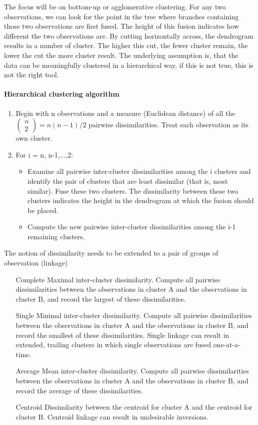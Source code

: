 \documentclass[../document.tex]{subfiles}
\begin{document}
	The focus will be on bottom-up or agglomerative clustering. For any two observations, we can look for the point in the tree where branches containing those two observations are first fused. The height of this fusion indicates how different the two observations are. By cutting horizontally across, the dendrogram results in a number of cluster. The higher this cut, the fewer cluster remain, the lower the cut the more cluster result. The underlying assumption is, that the data can be meaningfully clustered in a hierarchical way, if this is not true, this is not the right tool.

	\paragraph{Hierarchical clustering algorithm}
	\begin{enumerate}
		\item Begin with n observations and a measure (Euclidean distance) of all the
		\(
		\begin{pmatrix}
			n\\2
		\end{pmatrix} = n(n-1)/2
		\)
		 pairwise dissimilarities. Treat each observation as its own cluster.
		\item For i = n, n-1,...,2:
		\begin{itemize}
			\item Examine all pairwise inter-cluster dissimilarities among the i clusters and identify the pair of clusters that are least dissimilar (that is, most similar). Fuse these two clusters. The dissimilarity between these two clusters indicates the height in the dendrogram at which the fusion should be placed.
			\item Compute the new pairwise inter-cluster dissimilarities among the i-1 remaining clusters.
		\end{itemize}
	\end{enumerate}
	The notion of dissimilarity needs to be extended to a pair of groups of observation (linkage)
	\begin{itemize}
		\item [Complete] Maximal inter-cluster dissimilarity. Compute all pairwise dissimilarities between the observations in cluster A and the observations in cluster B, and record the largest of these dissimilarities.
		\item [Single] Minimal inter-cluster dissimilarity. Compute all pairwise dissimilarities between the observations in cluster A and the observations in cluster B, and record the smallest of these dissimilarities. Single linkage can result in extended, trailing clusters in which single observations are fused one-at-a-time.
		\item [Average] Mean inter-cluster dissimilarity. Compute all pairwise dissimilarities between the observations in cluster A and the observations in cluster B, and record the average of these dissimilarities.
		\item [Centroid] Dissimilarity between the centroid for cluster A and the centroid for cluster B. Centroid linkage can result in undesirable inversions.
	\end{itemize}
\end{document}
